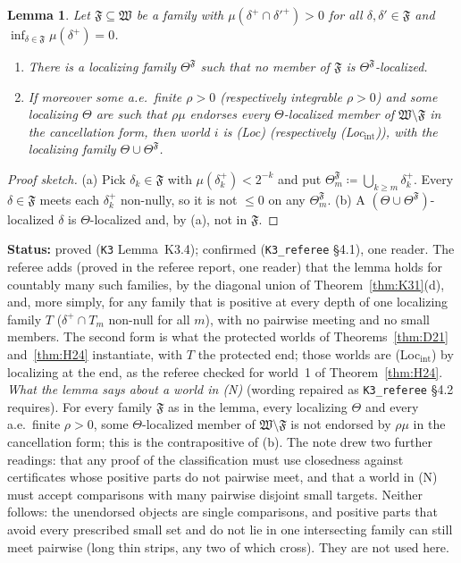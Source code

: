 \documentclass[11pt]{article}
\newtheorem{lemma}[theorem]{Lemma}
\theoremstyle{definition}
\theoremstyle{remark}
\newcommand{\src}[1]{\texttt{#1}}
\newcommand{\status}[1]{\par\smallskip\noindent\textbf{Status:} #1\par\smallskip}
\begin{document}
\begin{lemma}\label{lem:K34}
Let $\mathfrak F\subseteq\mathfrak W$ be a family with $\mu(\delta^+\cap\delta'^+)>0$ for all $\delta,\delta'\in\mathfrak F$ and $\inf_{\delta\in\mathfrak F}\mu(\delta^+)=0$.
\begin{enumerate}[leftmargin=*,label=(\alph*)]
\item There is a localizing family $\Theta^{\mathfrak F}$ such that no member of $\mathfrak F$ is $\Theta^{\mathfrak F}$-localized.
\item If moreover some a.e.\ finite $\rho>0$ (respectively integrable $\rho>0$) and some localizing $\Theta$ are such that $\rho\mu$ endorses every $\Theta$-localized member of $\mathfrak W\setminus\mathfrak F$ in the cancellation form, then world $i$ is (Loc) (respectively (Loc$_{\mathrm{int}}$)), with the localizing family $\Theta\cup\Theta^{\mathfrak F}$.
\end{enumerate}
\end{lemma}
\begin{proof}[Proof sketch]
(a) Pick $\delta_k\in\mathfrak F$ with $\mu(\delta_k^+)<2^{-k}$ and put $\Theta^{\mathfrak F}_m\coloneqq\bigcup_{k\ge m}\delta_k^+$. Every $\delta\in\mathfrak F$ meets each $\delta_k^+$ non-nully, so it is not $\le0$ on any $\Theta^{\mathfrak F}_m$. (b) A $(\Theta\cup\Theta^{\mathfrak F})$-localized $\delta$ is $\Theta$-localized and, by (a), not in $\mathfrak F$.
\end{proof}
\status{proved (\src{K3} Lemma~K3.4); confirmed (\src{K3\_referee} \S4.1), one reader. The referee adds (proved in the referee report, one reader) that the lemma holds for countably many such families, by the diagonal union of Theorem~\ref{thm:K31}(d), and, more simply, for any family that is positive at every depth of one localizing family $T$ ($\delta^+\cap T_m$ non-null for all $m$), with no pairwise meeting and no small members. The second form is what the protected worlds of Theorems~\ref{thm:D21} and~\ref{thm:H24} instantiate, with $T$ the protected end; those worlds are (Loc$_{\mathrm{int}}$) by localizing at the end, as the referee checked for world~1 of Theorem~\ref{thm:H24}. \emph{What the lemma says about a world in (N)} (wording repaired as \src{K3\_referee} \S4.2 requires). For every family $\mathfrak F$ as in the lemma, every localizing $\Theta$ and every a.e.\ finite $\rho>0$, some $\Theta$-localized member of $\mathfrak W\setminus\mathfrak F$ is not endorsed by $\rho\mu$ in the cancellation form; this is the contrapositive of (b). The note drew two further readings: that any proof of the classification must use closedness against certificates whose positive parts do not pairwise meet, and that a world in (N) must accept comparisons with many pairwise disjoint small targets. Neither follows: the unendorsed objects are single comparisons, and positive parts that avoid every prescribed small set and do not lie in one intersecting family can still meet pairwise (long thin strips, any two of which cross). They are not used here.}
\end{document}
